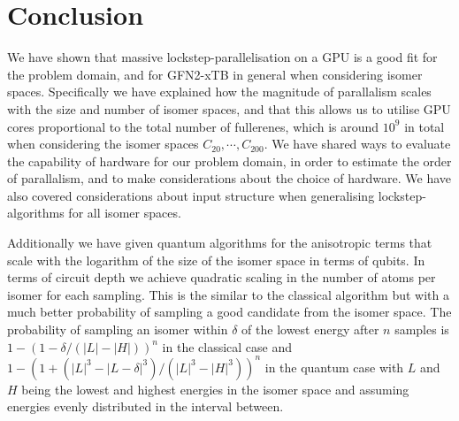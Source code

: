 \chapter{Conclusion}\label{sec:conclusion}

We have shown that massive lockstep-parallelisation on a GPU is a good fit for the problem domain, and for GFN2-xTB in general when considering isomer spaces. Specifically we have explained how the magnitude of parallalism scales with the size and number of isomer spaces, and that this allows us to utilise GPU cores proportional to the total number of fullerenes, which is around $10^9$ in total when considering the isomer spaces \(C_{20}, \cdots, C_{200} \). We have shared ways to evaluate the capability of hardware for our problem domain, in order to estimate the order of parallalism, and to make considerations about the choice of hardware. We have also covered considerations about input structure when generalising lockstep-algorithms for all isomer spaces.

Additionally we have given quantum algorithms for the anisotropic terms that scale with the logarithm of the size of the isomer space in terms of qubits. In terms of circuit depth we achieve quadratic scaling in the number of atoms per isomer for each sampling. This is the similar to the classical algorithm but with a much better probability of sampling a good candidate from the isomer space. The probability of sampling an isomer within $\delta$ of the lowest energy after $n$ samples is $1-(1-\delta/(|L|-|H|))^n$ in the classical case and $1-(1+(|L|^3-|L-\delta|^3)/(|L|^3-|H|^3))^n$ in the quantum case with $L$ and $H$ being the lowest and highest energies in the isomer space and assuming energies evenly distributed in the interval between.
